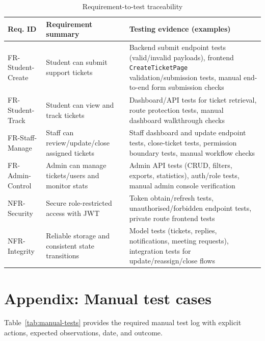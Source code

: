 \begin{table}[H]
\centering
\footnotesize
\begin{tabularx}{\textwidth}{|p{1.4cm}|X|X|}
\hline
	Req. ID & \textbf{Requirement summary} & \textbf{Testing evidence (examples)} \\
\hline
FR-Student-Create & Student can submit support tickets & Backend submit endpoint tests (valid/invalid payloads), frontend \texttt{CreateTicketPage} validation/submission tests, manual end-to-end form submission checks \\
\hline
FR-Student-Track & Student can view and track tickets & Dashboard/API tests for ticket retrieval, route protection tests, manual dashboard walkthrough checks \\
\hline
FR-Staff-Manage & Staff can review/update/close assigned tickets & Staff dashboard and update endpoint tests, close-ticket tests, permission boundary tests, manual workflow checks \\
\hline
FR-Admin-Control & Admin can manage tickets/users and monitor stats & Admin API tests (CRUD, filters, exports, statistics), auth/role tests, manual admin console verification \\
\hline
NFR-Security & Secure role-restricted access with JWT & Token obtain/refresh tests, unauthorised/forbidden endpoint tests, private route frontend tests \\
\hline
NFR-Integrity & Reliable storage and consistent state transitions & Model tests (tickets, replies, notifications, meeting requests), integration tests for update/reassign/close flows \\
\hline
\end{tabularx}
\caption{Requirement-to-test traceability}
\label{tab:test-traceability}
\end{table}

\section{Appendix: Manual test cases}
\label{sec:manual-test-appendix}

Table~\ref{tab:manual-tests} provides the required manual test log with explicit actions, expected observations, date, and outcome.

